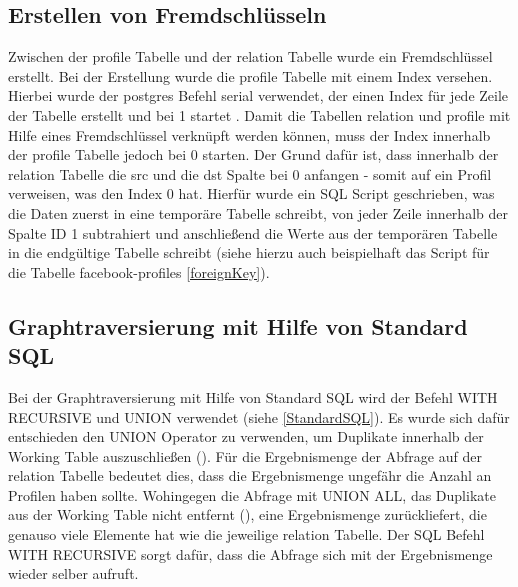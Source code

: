 \subsection{Erstellen von Fremdschlüsseln}
Zwischen der profile Tabelle und der relation Tabelle wurde ein Fremdschlüssel erstellt. Bei der Erstellung wurde die profile Tabelle
mit einem Index versehen. Hierbei wurde der postgres Befehl serial verwendet, der einen Index für jede Zeile der Tabelle erstellt und bei 1 startet . Damit die Tabellen
relation und profile mit Hilfe eines Fremdschlüssel verknüpft werden können, muss der Index innerhalb der profile Tabelle jedoch bei 0 starten. Der Grund dafür ist, dass
innerhalb der relation Tabelle die src und die dst Spalte bei 0 anfangen - somit auf ein Profil verweisen, was den Index 0 hat. Hierfür wurde ein SQL Script geschrieben,
was die Daten zuerst in eine temporäre Tabelle schreibt, von jeder Zeile innerhalb der Spalte ID 1 subtrahiert und anschließend die Werte aus der temporären Tabelle
in die endgültige Tabelle schreibt (siehe hierzu auch beispielhaft das Script für die Tabelle facebook-profiles \ref{foreignKey}).


\subsection{Graphtraversierung mit Hilfe von Standard \ac{SQL}}
Bei der Graphtraversierung mit Hilfe von Standard \ac{SQL} wird der Befehl WITH RECURSIVE und UNION verwendet (siehe \ref{StandardSQL}).
Es wurde sich dafür entschieden den
UNION Operator zu verwenden, um Duplikate innerhalb der Working Table auszuschließen (\cite{postgresWithRecursive}). Für die Ergebnismenge der Abfrage auf der relation
Tabelle bedeutet dies, dass die Ergebnismenge ungefähr die Anzahl an Profilen haben sollte. Wohingegen die Abfrage mit UNION ALL, das Duplikate aus der Working Table
nicht entfernt (\cite{postgresWithRecursive}), eine Ergebnismenge zurückliefert, die genauso viele Elemente hat wie die jeweilige relation Tabelle. Der SQL Befehl WITH RECURSIVE
sorgt dafür, dass die Abfrage sich mit der Ergebnismenge wieder selber aufruft.

